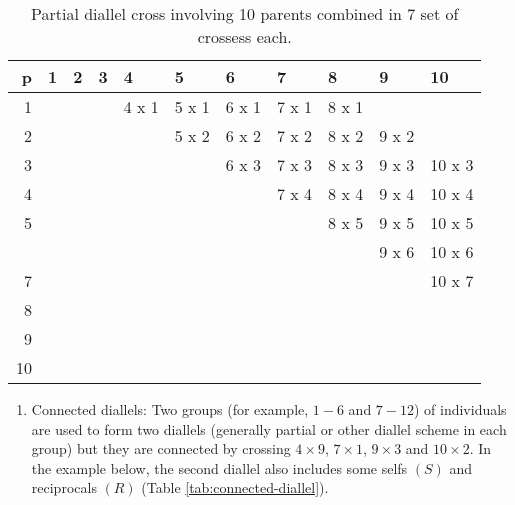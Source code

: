 \documentclass[nofonts,]{tufte-handout}
\providecommand{\tightlist}{%
  \setlength{\itemsep}{0pt}\setlength{\parskip}{0pt}}
\begin{document}
\begin{longtable}[t]{rllllllllll}
\caption{\label{tab:partial-diallel-10p-table}Partial diallel cross involving 10 parents combined in 7 set of crossess each.}\\
\toprule
p & 1 & 2 & 3 & 4 & 5 & 6 & 7 & 8 & 9 & 10\\
\midrule
\rowcolor{gray!6}  1 &  &  &  & 4 x 1 & 5 x 1 & 6 x 1 & 7 x 1 & 8 x 1 &  & \\
2 &  &  &  &  & 5 x 2 & 6 x 2 & 7 x 2 & 8 x 2 & 9 x 2 & \\
\rowcolor{gray!6}  3 &  &  &  &  &  & 6 x 3 & 7 x 3 & 8 x 3 & 9 x 3 & 10 x 3\\
4 &  &  &  &  &  &  & 7 x 4 & 8 x 4 & 9 x 4 & 10 x 4\\
\rowcolor{gray!6}  5 &  &  &  &  &  &  &  & 8 x 5 & 9 x 5 & 10 x 5\\
\addlinespace
6 &  &  &  &  &  &  &  &  & 9 x 6 & 10 x 6\\
\rowcolor{gray!6}  7 &  &  &  &  &  &  &  &  &  & 10 x 7\\
8 &  &  &  &  &  &  &  &  &  & \\
\rowcolor{gray!6}  9 &  &  &  &  &  &  &  &  &  & \\
10 &  &  &  &  &  &  &  &  &  & \\
\bottomrule
\end{longtable}
\endgroup{}

\begin{enumerate}
\def\labelenumi{\arabic{enumi}.}
\setcounter{enumi}{3}
\tightlist
\item
  Connected diallels: Two groups (for example, \(1-6\) and \(7-12\)) of
  individuals are used to form two diallels (generally partial or other
  diallel scheme in each group) but they are connected by crossing
  \(4 \times 9\), \(7 \times 1\), \(9 \times 3\) and \(10 \times 2\). In
  the example below, the second diallel also includes some selfs \((S)\)
  and reciprocals \((R)\) (Table \ref{tab:connected-diallel}).
\end{enumerate}

\begingroup\fontsize{8}{10}\selectfont
\end{document}

